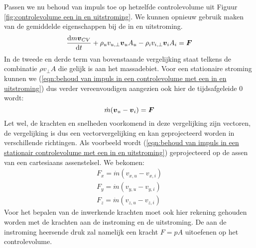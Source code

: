 Passen we nu behoud van impuls toe op hetzelfde controlevolume uit Figuur \ref{fig:controlevolume een in en uitstroming}. We kunnen opnieuw gebruik maken van de gemiddelde eigenschappen bij de in en uitstroming.
\begin{equation}
	 \dfrac{\mathrm{d} m \boldsymbol{v}_{CV}}{\mathrm{d} t} + \rho_{u} v_{u,\perp} \boldsymbol{v}_{u} A_{u} - \rho_{i} v_{i,\perp} \boldsymbol{v}_{i} A_{i} = \boldsymbol{F}
	\label{eqn:behoud van impuls in een controlevolume met een in en uitstroming}
\end{equation}
In de tweede en derde term van bovenstaande vergelijking staat telkens de combinatie $\rho v_{\perp} A$ die gelijk is aan het massadebiet. Voor een stationaire stroming kunnen we (\ref{eqn:behoud van impuls in een controlevolume met een in en uitstroming}) dus verder vereenvoudigen aangezien ook hier de tijdsafgeleide $0$ wordt:
\begin{equation}
	\dot{m} (\boldsymbol{v}_u-\boldsymbol{v}_i) = \boldsymbol{F}
	\label{eqn:behoud van impuls in een stationair controlevolume met een in en uitstroming}
\end{equation}
Let wel, de krachten en snelheden voorkomend in deze vergelijking zijn vectoren, de vergelijking is dus een vectorvergelijking en kan geprojecteerd worden in verschillende richtingen. Als voorbeeld wordt (\ref{eqn:behoud van impuls in een stationair controlevolume met een in en uitstroming}) geprojecteerd op de assen van een cartesiaans assenstelsel. We bekomen:
\begin{eqnarray}
	F_x = \dot{m} (v_{x,u}-v_{x,i}) \nonumber \\
	F_y = \dot{m} (v_{y,u}-v_{y,i}) \\
	F_z = \dot{m} (v_{z,u}-v_{z,i}) \nonumber
	\label{eqn:behoud van impuls in een stationair controlevolume met een in en uitstroming geprojecteerd}
\end{eqnarray}
Voor het bepalen van de inwerkende krachten moet ook hier rekening gehouden worden met de krachten aan de instroming en de uitstroming. De aan de instroming heersende druk zal namelijk een kracht $F = p A$ uitoefenen op het controlevolume.

